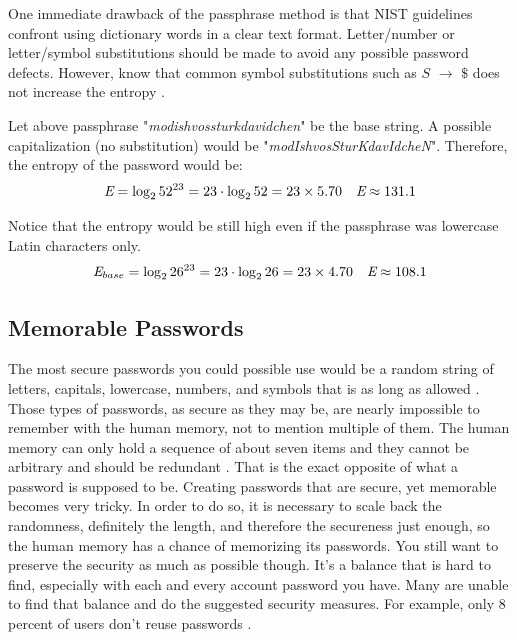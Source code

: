 \documentclass[acmsmall,nonacm]{acmart}
\begin{document}
\newpage
One immediate drawback of the passphrase method is that NIST guidelines confront using dictionary words in a clear text format. Letter/number or letter/symbol substitutions should be made to avoid any possible password defects. However, know that common symbol substitutions such as $S$ ${\displaystyle \rightarrow }$ $\$$ does not increase the entropy \cite{ur_2015}.

Let above passphrase "\emph{modishvossturkdavidchen}" be the base string. A possible capitalization (no substitution) would be "\emph{modIshvosSturKdavIdcheN}". Therefore, the entropy of the password would be:
\begin{align*}
    \emph{E} = \log_2 52^{23} &= 23 \cdot \log_2 52 = 23 \times 5.70 &\emph{E} \approx 131.1 
\end{align*}

Notice that the entropy would be still high even if the passphrase was lowercase Latin characters only.
\begin{align*}
    \emph{E}_{base} = \log_2 26^{23} &= 23 \cdot \log_2 26 = 23 \times 4.70 &\emph{E} \approx 108.1
\end{align*}

\subsection{Memorable Passwords}  \label{memorable}

The most secure passwords you could possible use would be a random string of letters, capitals, lowercase, numbers, and symbols that is as long as allowed \cite{lee_2014,nist_2020}. Those types of passwords, as secure as they may be, are nearly impossible to remember with the human memory, not to mention multiple of them. The human memory can only hold a sequence of about seven items and they cannot be arbitrary and should be redundant \cite{yan_2000}. That is the exact opposite of what a password is supposed to be. Creating passwords that are secure, yet memorable becomes very tricky. In order to do so, it is necessary to scale back the randomness, definitely the length, and therefore the secureness just enough, so the human memory has a chance of memorizing its passwords. You still want to preserve the security as much as possible though. It’s a balance that is hard to find, especially with each and every account password you have. Many are unable to find that balance and do the suggested security measures. For example, only 8 percent of users don’t reuse passwords \cite{lee_2014}.
\end{document}
